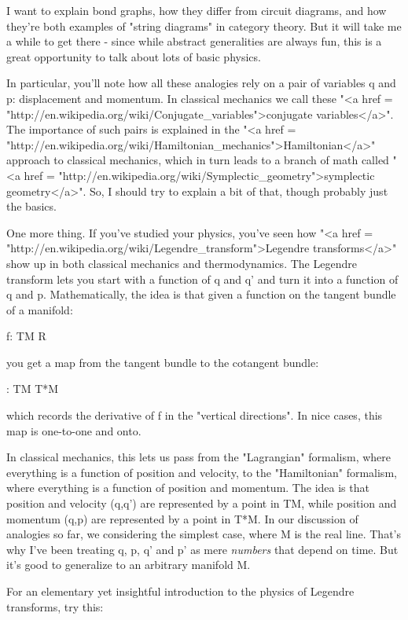 I want to explain bond graphs, how they differ from circuit diagrams,
and how they're both examples of "string diagrams" in
category theory.  But it will take me a while to get there - since
while abstract generalities are always fun, this is a great
opportunity to talk about lots of basic physics.

In particular, you'll note how all these analogies rely on a pair of
variables q and p: displacement and momentum.  In classical mechanics
we call these "<a href =
"http://en.wikipedia.org/wiki/Conjugate_variables">conjugate
variables</a>".  The importance of such pairs is explained in the
"<a href =
"http://en.wikipedia.org/wiki/Hamiltonian_mechanics">Hamiltonian</a>"
approach to classical mechanics, which in turn leads to a branch of
math called "<a href =
"http://en.wikipedia.org/wiki/Symplectic_geometry">symplectic
geometry</a>".  So, I should try to explain a bit of that, though
probably just the basics.

One more thing.  If you've studied your physics, you've seen how
"<a href =
"http://en.wikipedia.org/wiki/Legendre_transform">Legendre
transforms</a>" show up in both classical mechanics and
thermodynamics.  The Legendre transform lets you start with a function
of q and q' and turn it into a function of q and p.  Mathematically,
the idea is that given a function on the tangent bundle of a manifold:

f: TM \to  R

you get a map from the tangent bundle to the cotangent bundle:

\lambda : TM \to  T*M

which records the derivative of f in the "vertical directions".
In nice cases, this map \lambda  is one-to-one and onto.

In classical mechanics, this lets us pass from the "Lagrangian"
formalism, where everything is a function of position and velocity, to
the "Hamiltonian" formalism, where everything is a function of
position and momentum.  The idea is that position and velocity (q,q')
are represented by a point in TM, while position and momentum (q,p)
are represented by a point in T*M.  In our discussion of analogies so
far, we considering the simplest case, where M is the real line.
That's why I've been treating q, p, q' and p' as mere \emph{numbers} that
depend on time.  But it's good to generalize to an arbitrary manifold M.

For an elementary yet insightful introduction to the physics of Legendre
transforms, try this:

